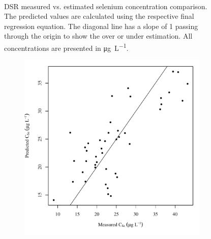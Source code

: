 \begin{landscape}
\begin{figure}
\begin{subfigure}{0.7\textwidth}
		\end{subfigure}\\
		\caption[DSR measured vs. estimated selenium concentration comparison.]{DSR measured vs. estimated selenium concentration comparison.  The predicted values are calculated using the respective final regression equation.  The diagonal line has a slope of 1 passing through the origin to show the over or under estimation.  All concentrations are presented in \si{\micro\gram\per\liter}.}
		\label{fig:concPredVMeas_DS}
	\end{figure}
\end{landscape}

\subfiguremid
\begin{landscape}
	\begin{figure}
		\begin{subfigure}{0.7\textwidth}
			\centering
			\includegraphics[width=\tableCustomSize]{"Figures/Results_DSR/Stochastic/Conc Model pred v meas BIG"}
		\end{subfigure}%
		\begin{subfigure}{0.7\textwidth}
			\centering

\end{subfigure}
\end{figure}
\end{landscape}
